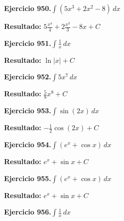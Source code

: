 \documentclass[10pt,a4paper]{article}
\begin{document}
\begin{ejbox}
\textbf{Ejercicio 950.}\quad $\int (5x^3 +2x^2 -8)\,dx$
\end{ejbox}

\begin{solbox}
\textbf{Resultado:} \(\displaystyle 5\frac{x^4}{4} +2\frac{x^3}{3} -8x + C\)
\end{solbox}

\begin{ejbox}
\textbf{Ejercicio 951.}\quad $\int \frac{1}{x}\,dx$
\end{ejbox}

\begin{solbox}
\textbf{Resultado:} \(\displaystyle \ln|x| + C\)
\end{solbox}

\newpage
\begin{ejbox}
\textbf{Ejercicio 952.}\quad $\int 5x^{7}\,dx$
\end{ejbox}

\begin{solbox}
\textbf{Resultado:} \(\displaystyle \frac{5}{8}x^{8} + C\)
\end{solbox}

\begin{ejbox}
\textbf{Ejercicio 953.}\quad $\int \sin(2x)\,dx$
\end{ejbox}

\begin{solbox}
\textbf{Resultado:} \(\displaystyle -\frac{1}{2}\cos(2x) + C\)
\end{solbox}

\begin{ejbox}
\textbf{Ejercicio 954.}\quad $\int (e^x + \cos x)\,dx$
\end{ejbox}

\begin{solbox}
\textbf{Resultado:} \(\displaystyle e^x + \sin x + C\)
\end{solbox}

\newpage
\begin{ejbox}
\textbf{Ejercicio 955.}\quad $\int (e^x + \cos x)\,dx$
\end{ejbox}

\begin{solbox}
\textbf{Resultado:} \(\displaystyle e^x + \sin x + C\)
\end{solbox}

\begin{ejbox}
\textbf{Ejercicio 956.}\quad $\int \frac{1}{x}\,dx$
\end{ejbox}
\end{document}

